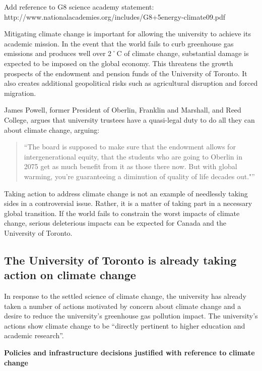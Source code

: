 \begin{vcom}
	Add reference to G8 science academy statement: http://www.nationalacademies.org/includes/G8+5energy-climate09.pdf
\end{vcom}


Mitigating climate change is important for allowing the university to achieve its academic mission. 
In the event that the world fails to curb greenhouse gas emissions and produces well over 2˚C of climate change, substantial damage is expected to be imposed on the global economy. 
This threatens the growth prospects of the endowment and pension funds of the University of Toronto. 
It also creates additional geopolitical risks such as agricultural disruption and forced migration.



James Powell, former President of Oberlin, Franklin and Marshall, and Reed College, argues that university trustees have a quasi-legal duty to do all they can about climate change, arguing:
\begin{quotation}
``The board is supposed to make sure that the endowment allows for intergenerational equity, that the students who are going to Oberlin in 2075 get as much benefit from it as those there now. But with global warming, you’re guaranteeing a diminution of quality of life decades out."''
\end{quotation}
Taking action to address climate change is not an example of needlessly taking sides in a controversial issue. Rather, it is a matter of taking part in a necessary global transition. 
If the world fails to constrain the worst impacts of climate change, serious deleterious impacts can be expected for Canada and the University of Toronto.



	\subsection{The University of Toronto is already taking action on climate change}


In response to the settled science of climate change, the university has already taken a number of actions motivated by concern about climate change and a desire to reduce the university's greenhouse gas pollution impact.
The university's actions show climate change to be ``directly pertinent to higher education and academic research''.



\textbf{Policies and infrastructure decisions justified with reference to climate change}

